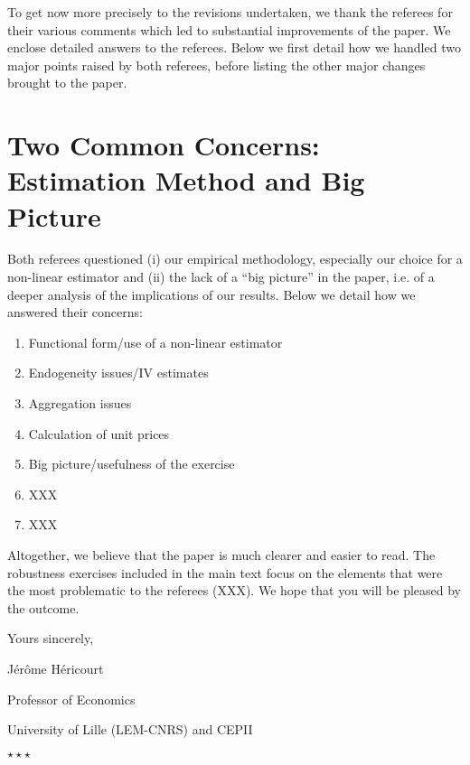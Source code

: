 \documentclass[12pt]{article}
\newcommand*\sepstars{%
  \begin{center}
    $\star\star\star$
  \end{center}}
\begin{document}
To get now more precisely to the revisions undertaken, we thank the referees for their various comments which led to substantial improvements of the paper. We enclose detailed answers to the referees. Below we first detail how we handled two major points raised by both referees, before listing the other major changes brought to the paper.

\section{Two Common Concerns: Estimation Method and Big Picture}
Both referees questioned (i) our empirical methodology, especially our choice for a non-linear estimator and (ii) the lack of a ``big picture'' in the paper, i.e. of a deeper analysis of the implications of our results. Below we detail how we answered their concerns:\medskip



\begin{enumerate}


\item Functional form/use of a non-linear estimator
\item Endogeneity issues/IV estimates
\item Aggregation issues
\item Calculation of unit prices
\item Big picture/usefulness of the exercise
\item XXX
\item XXX


\end{enumerate}

Altogether, we believe that the paper is much clearer and easier to read. The robustness exercises included in the main text focus on the elements that were the most problematic to the referees (XXX). We hope that you will be pleased by the outcome.

\bigskip

Yours sincerely,

\bigskip

\hfill Jérôme Héricourt

\hfill Professor of Economics

\hfill University of Lille (LEM-CNRS) and CEPII

\bigskip
\bigskip
\bigskip
\sepstars
\end{document}
